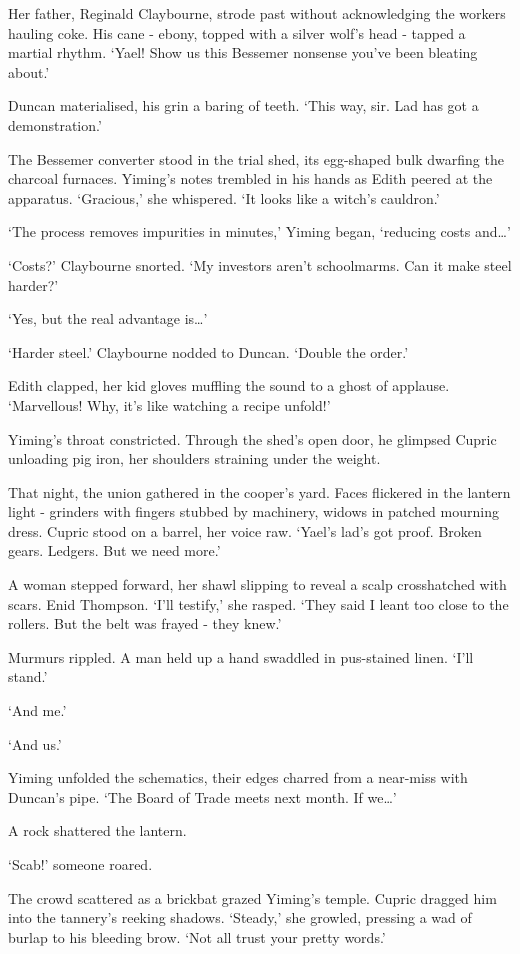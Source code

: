Her father, Reginald Claybourne, strode past without acknowledging the workers hauling coke. His cane - ebony, topped with a silver wolf's head - tapped a martial rhythm. `Yael! Show us this Bessemer nonsense you've been bleating about.'

Duncan materialised, his grin a baring of teeth. `This way, sir. Lad has got a demonstration.'

The Bessemer converter stood in the trial shed, its egg-shaped bulk dwarfing the charcoal furnaces. Yiming's notes trembled in his hands as Edith peered at the apparatus. `Gracious,' she whispered. `It looks like a witch's cauldron.'

`The process removes impurities in minutes,' Yiming began, `reducing costs and\dots'

`Costs?' Claybourne snorted. `My investors aren't schoolmarms. Can it make steel harder?'

`Yes, but the real advantage is\dots'

`Harder steel.' Claybourne nodded to Duncan. `Double the order.'

Edith clapped, her kid gloves muffling the sound to a ghost of applause. `Marvellous! Why, it's like watching a recipe unfold!'

Yiming's throat constricted. Through the shed's open door, he glimpsed Cupric unloading pig iron, her shoulders straining under the weight.

That night, the union gathered in the cooper's yard. Faces flickered in the lantern light - grinders with fingers stubbed by machinery, widows in patched mourning dress. Cupric stood on a barrel, her voice raw. `Yael's lad's got proof. Broken gears. Ledgers. But we need more.'

A woman stepped forward, her shawl slipping to reveal a scalp crosshatched with scars. Enid Thompson. `I'll testify,' she rasped. `They said I leant too close to the rollers. But the belt was frayed - they knew.'

Murmurs rippled. A man held up a hand swaddled in pus-stained linen. `I'll stand.'

`And me.'

`And us.'

Yiming unfolded the schematics, their edges charred from a near-miss with Duncan's pipe. `The Board of Trade meets next month. If we\dots'

A rock shattered the lantern.

`Scab!' someone roared.

The crowd scattered as a brickbat grazed Yiming's temple. Cupric dragged him into the tannery's reeking shadows. `Steady,' she growled, pressing a wad of burlap to his bleeding brow. `Not all trust your pretty words.'

